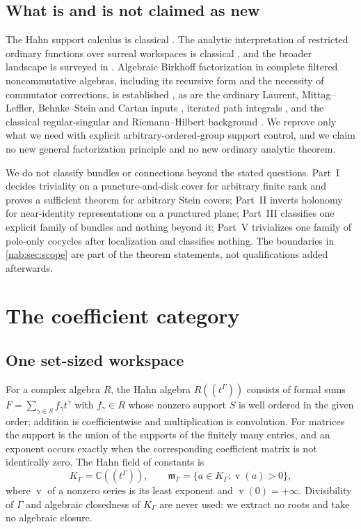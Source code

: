 \documentclass[11pt,letterpaper]{article}
\theoremstyle{definition}
\theoremstyle{remark}
\newcommand{\C}{\mathbb C}
\newcommand{\K}{K_\Gamma}
\newcommand{\mm}{\mathfrak m_\Gamma}
\newcommand{\val}{\operatorname{v}}
\numberwithin{equation}{section}
\begin{document}
\subsection{What is and is not claimed as new}

The Hahn support calculus is classical \cite{Neumann,Poonen}. The analytic
interpretation of restricted ordinary functions over surreal workspaces is
classical \cite{vdDE}, and the broader landscape is surveyed in
\cite{MantovaMatusinski}. Algebraic Birkhoff factorization in complete
filtered noncommutative algebras, including its recursive form and the
necessity of commutator corrections, is established \cite{EFGK,EFMP}, as are
the ordinary Laurent, Mittag--Leffler, Behnke--Stein and Cartan inputs
\cite{BS,Cartan,Schmitt}, iterated path integrals \cite{Chen}, and the
classical regular-singular and Riemann--Hilbert background
\cite{Deligne,Ilyashenko}. We reprove only what we need with explicit
arbitrary-ordered-group support control, and we claim no new general
factorization principle and no new ordinary analytic theorem.

We do not classify bundles or connections beyond the stated questions. Part~I
decides triviality on a puncture-and-disk cover for arbitrary finite rank and
proves a sufficient theorem for arbitrary Stein covers; Part~II inverts
holonomy for near-identity representations on a punctured plane; Part~III
classifies one explicit family of bundles and nothing beyond it; Part~V
trivializes one family of pole-only cocycles after localization and classifies
nothing. The boundaries in \cref{nab:sec:scope} are part of the theorem
statements, not qualifications added afterwards.

\section{The coefficient category}\label{nab:sec:category}

\subsection{One set-sized workspace}

For a complex algebra $R$, the Hahn algebra $R((t^\Gamma))$ consists of formal
sums $F=\sum_{\gamma\in S}f_\gamma t^\gamma$ with $f_\gamma\in R$ whose
nonzero support $S$ is well ordered in the given order; addition is
coefficientwise and multiplication is convolution. For matrices the support
is the union of the supports of the finitely many entries, and an exponent
occurs exactly when the corresponding coefficient matrix is not identically
zero. The Hahn field of constants is
\[
 \K=\C((t^\Gamma)),\qquad
 \mm=\{a\in\K:\val(a)>0\},
\]
where $\val$ of a nonzero series is its least exponent and $\val(0)=+\infty$.
Divisibility of
$\Gamma$ and algebraic closedness of $\K$ are never used: we extract no roots
and take no algebraic closure.
\end{document}
